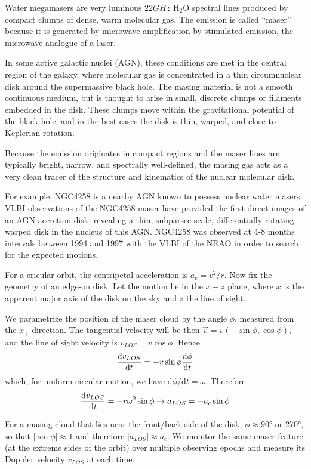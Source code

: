 Water megamasers are very luminous $22\unit{GHz}$ $\text{H}_{2}\text{O}$ spectral lines produced by compact clumps of dense, warm molecular gas. The emission is called “maser” because it is generated by microwave amplification by stimulated emission, the microwave analogue of a laser.
\par In some active galactic nuclei (AGN), these conditions are met in the central region of the galaxy, where molecular gas is concentrated in a thin circumnuclear disk around the supermassive black hole. The masing material is not a smooth continuous medium, but is thought to arise in small, discrete clumps or filaments embedded in the disk. These clumps move within the gravitational potential of the black hole, and in the best cases the disk is thin, warped, and close to Keplerian rotation.
\par Because the emission originates in compact regions and the maser lines are typically bright, narrow, and spectrally well-defined, the masing gas acts as a very clean tracer of the structure and kinematics of the nuclear molecular disk.
\par For example, NGC4258 is a nearby AGN known to possess nuclear water masers. VLBI observations of the NGC4258 maser have provided the first direct images of an AGN accretion disk, revealing a thin, subparsec-scale, differentially rotating warped disk in the nucleus of this AGN. NGC4258 was observed at 4-8 months intervals between 1994 and 1997 with the VLBI of the NRAO in order to search for the expected motions.
\par For a cricular orbit, the centripetal acceleration is $a_{c}=v^{2}/r$. Now fix the geometry of an edge-on disk. Let the motion lie in the $x-z$ plane, where $x$ is the apparent major axis of the disk on the sky and $z$ the line of sight.
\par We parametrize the position of the maser cloud by the angle $\phi$, measured from the $x_{+}$ direction. The tangential velocity will be then $\vec{v} = v(-\sin\phi, \cos\phi)$, and the line of sight velocity is $v_{LOS} = v\cos\phi$. Hence
\begin{equation*}
    \frac{\text{d}v_{LOS}}{\text{d}t} = -v\sin\phi\frac{\text{d}\phi}{\text{d}t}
\end{equation*}
which, for uniform circular motion, we have $\text{d}\phi/\text{d}t = \omega$. Therefore
\begin{equation*}
    \frac{\text{d}v_{LOS}}{\text{d}t} = -r\omega^{2}\sin\phi \to a_{LOS} = -a_{c}\sin\phi
\end{equation*}
\par For a masing cloud that lies near the front/back side of the disk, $\phi\approx 90\text{°}$ or 270°, so that $|\sin\phi|\approx 1$ and therefore $|a_{LOS}|\approx a_{c}$. We monitor the same maser feature (at the extreme sides of the orbit) over multiple observing epochs and measure its Doppler velocity $v_{LOS}$ at each time.
